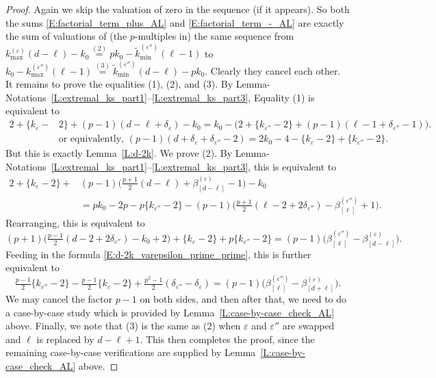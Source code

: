\begin{proof}
    Again we skip the valuation of zero in the sequence (if it appears).
    So both the sums \eqref{E:factorial_term_plus_AL} and \eqref{E:factorial_term_-_AL} are exactly the sum of valuations of (the $p$-multiples in) the same sequence from $k^{(\varepsilon)}_{\max}(d-\ell) - k_0\stackrel{(2)}= pk_0-\tilde  k_{\min}^{(\varepsilon'')}(\ell-1)$ to $ k_0 - k^{(\varepsilon'')}_{\max}(\ell-1) \stackrel{(3)}=\tilde k^{(\varepsilon'')}_{\min}(d-\ell) - pk_0$.
    Clearly they cancel each other.
    \medskip
    It remains to prove the equalities (1), (2), and (3).
    By Lemma-Notations~\ref{L:extremal_ks_part1}--\ref{L:extremal_ks_part3}, Equality (1) is equivalent to
    \begin{align*}
    2+\{k_\varepsilon -&2\} + (p-1)(d-\ell +\delta_\varepsilon) -k_0 = k_0 - \big( 2+\{k_{\varepsilon ''}-2\} + (p-1)(\ell-1 + \delta_{\varepsilon''} -1)\big). \\
    & \textrm{or equivalently, }(p-1)(d+\delta_\varepsilon + \delta_{\varepsilon''}-2) = 2k_0 -4 -\{k_\varepsilon-2\}+\{k_{\varepsilon''}-2\}.
    \end{align*}
    But this is exactly Lemma~\ref{L:d-2k}.
    We prove (2).
    By Lemma-Notations~\ref{L:extremal_ks_part1}--\ref{L:extremal_ks_part3}, this is equivalent to
    \begin{align*}
    2 +\{k_{\varepsilon} -2\} + &(p-1) \big(\tfrac{p+1}2 (d-\ell) +\beta_{[d-\ell]}^{(\varepsilon)}-1\big) - k_0 \\
    & = pk_0 -  2p -p\{k_{\varepsilon''} -2\} - (p-1) \big(\tfrac{p+1}2 (\ell-2+2\delta_{\varepsilon''}) -\beta_{[\ell]}^{(\varepsilon'')}+1\big) .
    \end{align*}
    Rearranging, this is equivalent to
    $$ (p+1) \big( \tfrac{p-1}2 (d-2+2\delta_{\varepsilon''})-k_0 + 2\big) + \{k_\varepsilon - 2\} +p\{k_{\varepsilon''}-2\} = (p-1)\big( \beta_{[\ell]}^{(\varepsilon'')}- \beta_{[d-\ell]}^{(\varepsilon)}\big). $$
    Feeding in the formula \eqref{E:d-2k_varepsilon_prime_prime}, this is further equivalent to
    $$ \tfrac{p-1}2\{k_{\varepsilon''} - 2\}-\tfrac{p-1}2\{k_\varepsilon-2\} + \tfrac{p^2-1}2(\delta_{\varepsilon''} - \delta_\varepsilon) =  (p-1)\big( \beta_{[\ell]}^{(\varepsilon'')}- \beta_{[d+\ell]}^{(\varepsilon)}\big). $$
    We may cancel the factor $p-1$ on both sides, and then after that, we need to do a case-by-case study which is provided by Lemma~\ref{L:case-by-case_check_AL} above.
    Finally, we note that (3) is the same as (2) when $\varepsilon$ and $\varepsilon''$ are swapped and $\ell$ is replaced by $d-\ell + 1$.
    This then completes the proof, since the remaining case-by-case verifications are supplied by Lemma~\ref{L:case-by-case_check_AL} above.
\end{proof}

